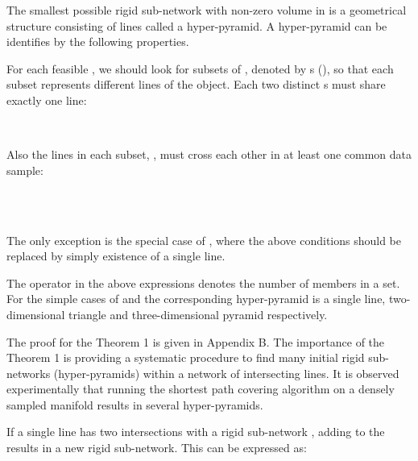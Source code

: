 \documentclass[10pt,journal,cspaper,compsoc]{IEEEtran}
\begin{document}
\begin{framed}
\begin{myTheorem}
The smallest possible rigid sub-network with non-zero volume in  is a geometrical structure consisting of  lines called a hyper-pyramid. A hyper-pyramid  can be identifies by the following properties.

\vspace{3mm}
For each feasible , we should look for  subsets of , denoted by s (), so that each subset represents  different lines of the object. Each two distinct s must share exactly one line:
\begin{center}
\\
\vspace{3mm}

\end{center}
Also the lines in each subset, , must cross each other in at least one common data sample:
\begin{center}
\\
\\ \vspace{1mm}

\end{center}
\vspace{3mm}
The only exception is the special case of , where the above conditions should be replaced by simply existence of a single line.
\end{myTheorem}
\end{framed}

The  operator in the above expressions denotes the number of members in a set. For the simple cases of  and  the corresponding hyper-pyramid is a single line, two-dimensional triangle and three-dimensional pyramid respectively.

The proof for the Theorem 1 is given in Appendix B. The importance of the Theorem 1 is providing a systematic procedure to find many initial rigid sub-networks (hyper-pyramids) within a network of intersecting lines. It is observed experimentally that running the shortest path covering algorithm on a densely sampled manifold results in several hyper-pyramids.
	
\begin{framed}
\begin{myTheorem}
If a single line  has two intersections with a rigid sub-network , adding  to the  results in a new rigid sub-network. This can be expressed as:
\begin{center}
\\
\vspace{1mm}

\end{center}
\end{myTheorem}
\end{framed}
\end{document}
